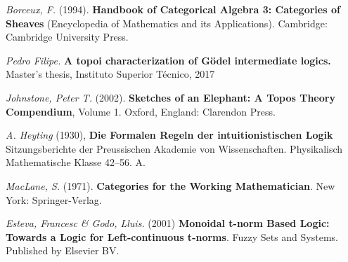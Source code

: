 \begin{thebibliography}{30}
	\emph{Borceux, F.} (1994). \textbf{Handbook of Categorical Algebra 3: Categories of Sheaves} (Encyclopedia of Mathematics and its Applications). Cambridge: Cambridge University Press.
	
	\emph{Pedro Filipe.} \textbf{A topoi characterization of Gödel intermediate logics.} Master’s
	thesis, Instituto Superior Técnico, 2017
	
	\emph{Johnstone, Peter T.} (2002). \textbf{Sketches of an Elephant: A Topos Theory Compendium}, Volume 1. Oxford, England: Clarendon Press.
	
	\emph{A. Heyting} (1930), \textbf{Die Formalen Regeln der intuitionistischen Logik} Sitzungsberichte der Preussischen Akademie von Wissenschaften. Physikalisch Mathematische Klasse 42–56. A.
	
	\emph{MacLane, S.} (1971). \textbf{Categories for the Working Mathematician}. New York: Springer-Verlag.
	
	\emph{Esteva, Francesc \& Godo, Lluis.} (2001) \textbf{Monoidal t-norm Based Logic: Towards a Logic for Left-continuous t-norms}. Fuzzy Sets and Systems. Published by Elsevier BV. 
	
	
\end{thebibliography}


